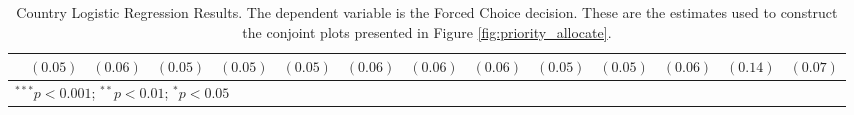 \begin{sidewaystable}
\begin{center}
\begin{scriptsize}
\begin{tabular}{l c c c c c c c c c c c c c}
                                                & $(0.05)$      & $(0.06)$      & $(0.05)$      & $(0.05)$      & $(0.05)$      & $(0.06)$      & $(0.06)$      & $(0.06)$      & $(0.05)$      & $(0.05)$      & $(0.06)$      & $(0.14)$      & $(0.07)$      \\
\hline
\multicolumn{14}{l}{\tiny{$^{***}p<0.001$; $^{**}p<0.01$; $^{*}p<0.05$}}
\end{tabular}
\end{scriptsize}
\caption{Country Logistic Regression Results. The dependent variable is the Forced Choice decision. These are the estimates used to construct the conjoint plots presented in Figure \ref{fig:priority_allocate}.}
\label{table:logit1}
\end{center}
\end{sidewaystable}
